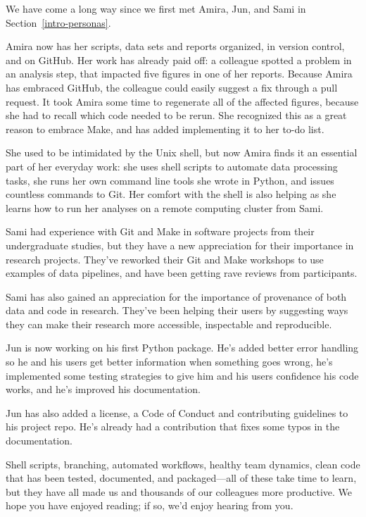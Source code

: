 \documentclass[
]{krantz}
\begin{document}
We have come a long way since we first met Amira, Jun, and Sami in Section~\ref{intro-personas}.

Amira now has her scripts, data sets and reports organized,
in version control,
and on GitHub.
Her work has already paid off:
a colleague spotted a problem in an analysis step,
that impacted five figures in one of her reports.
Because Amira has embraced GitHub,
the colleague could easily suggest a fix through a pull request.
It took Amira some time to regenerate all of the
affected figures, because she had to recall
which code needed to be rerun.
She recognized this as a great reason to embrace Make,
and has added implementing it to her to-do list.

She used to be intimidated by the Unix shell,
but now Amira finds it an essential part of her everyday work:
she uses shell scripts to automate data processing tasks,
she runs her own command line tools she wrote in Python,
and issues countless commands to Git.
Her comfort with the shell is also helping
as she learns how to run her analyses on a remote computing cluster
from Sami.

Sami had experience with Git and Make in software projects from
their undergraduate studies,
but they have a new appreciation for their importance in research projects.
They've reworked their Git and Make workshops to use examples of data pipelines,
and have been getting rave reviews from participants.

Sami has also gained an appreciation
for the importance of provenance
of both data and code in research.
They've been helping their users
by suggesting ways they can make their research more accessible, inspectable and reproducible.

Jun is now working on his first Python package.
He's added better error handling so he and his
users get better information when something goes wrong,
he's implemented some testing strategies to give him and his users confidence his code works, and
he's improved his documentation.

Jun has also added a license, a Code of Conduct and contributing guidelines to his project repo.
He's already had a contribution that fixes some typos
in the documentation.

Shell scripts,
branching,
automated workflows,
healthy team dynamics,
clean code that has been tested, documented, and packaged---all of these take time to learn,
but they have all made us and thousands of our colleagues more productive.
We hope you have enjoyed reading;
if so,
we'd enjoy hearing from you.
\end{document}
